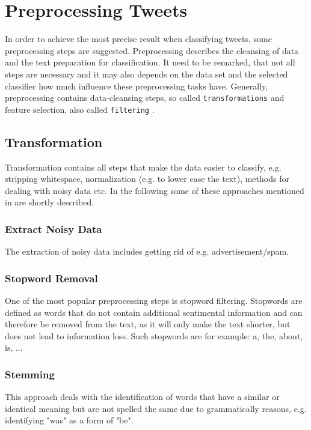 \documentclass{acm_proc_article-sp}
\begin{document}
\section{Preprocessing Tweets} \label{preprocessing} In order to achieve the
most precise result when classifying tweets, some preprocessing steps are
suggested. Preprocessing describes the cleansing of data and the text
preparation for classification. It need to be remarked, that not all steps are
necessary and it may also depends on the data set and the selected classifier
how much influence these preprocessing tasks have.  Generally, preprocessing
contains data-cleansing steps, so called \texttt{transformations} and feature
selection, also called \texttt{filtering} \cite{haddi2013therole}.


\subsection{Transformation} Transformation contains all steps that make the
data easier to classify, e.g. stripping whitespace, normalization (e.g. to
lower case the text), methods for dealing with noisy data etc.  In the
following some of these approaches mentioned in \cite{ting2011naive,
pak2010twitter, go2009twitter, agarwal2011sentiment, pang2008opinion,
haddi2013therole} are shortly described.

\subsubsection{Extract Noisy Data} The extraction of noisy data includes
getting rid of e.g. advertisement/spam.

\subsubsection{Stopword Removal} One of the most popular preprocessing steps is
stopword filtering. Stopwords are defined as words that do not contain
additional sentimental information and can therefore be removed from the text,
as it will only make the text shorter, but does not lead to information loss.
Such stopwords are for example: a, the, about, is, ...

\subsubsection{Stemming} This approach deals with the identification of words
that have a similar or identical meaning but are not spelled the same due to
grammatically reasons, e.g. identifying "was" as a form of "be".
\end{document}
